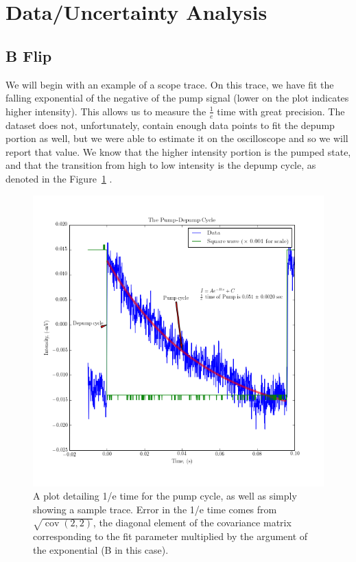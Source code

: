 \documentclass{article}
\DeclareMathOperator{\cov}{cov}
\begin{document}
\section{Data/Uncertainty Analysis}%
  \subsection{B Flip}
    We will begin with an example of a scope trace.  On this trace, we have fit the falling exponential of the negative of the pump signal (lower on the plot indicates higher intensity).  This allows us to measure the $\frac{1}{e}$ time with great precision.  The dataset does not, unfortunately, contain enough data points to fit the depump portion as well, but we were able to estimate it on the oscilloscope and so we will report that value.  We know that the higher intensity portion is the pumped state, and that the transition from high to low intensity is the depump cycle, as denoted in the Figure~\ref{trace_example} .
    \begin{figure}[!htb]
      \centering
      \includegraphics[scale=.65]{../plots/trace_example.png}
      \caption{A plot detailing 1/e time for the pump cycle, as well as simply showing a sample trace.  Error in the 1/e time comes from $\sqrt{\cov(2,2)}$, the diagonal element of the covariance matrix corresponding to the fit parameter multiplied by the argument of the exponential (B in this case).}
      \label{trace_example}
    \end{figure}
\end{document}
